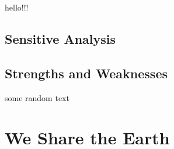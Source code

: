 \documentclass[12pt]{article}
\begin{document}
	hello!!! \\

	\subsection{Sensitive Analysis}

	\subsection{Strengths and Weaknesses}

	some random text
	
\section*{We Share the Earth}



\newrefcontext
\printbibliography
\end{document}
